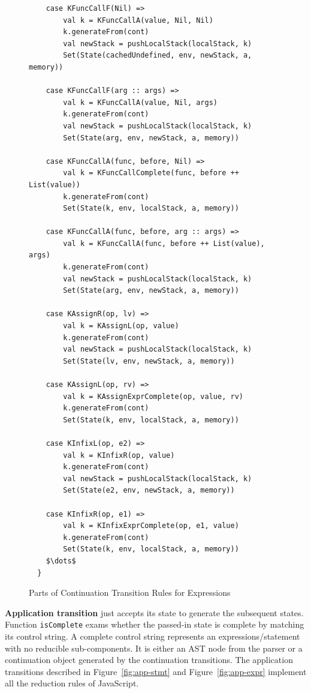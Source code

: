 \documentclass[12pt]{report}
\begin{document}
\begin{figure}
\lstset{language=Scala, mathescape,
basicstyle=\scriptsize\ttfamily}
\begin{lstlisting}
    case KFuncCallF(Nil) =>
        val k = KFuncCallA(value, Nil, Nil)
        k.generateFrom(cont)
        val newStack = pushLocalStack(localStack, k)
        Set(State(cachedUndefined, env, newStack, a, memory))

    case KFuncCallF(arg :: args) =>
        val k = KFuncCallA(value, Nil, args)
        k.generateFrom(cont)
        val newStack = pushLocalStack(localStack, k)
        Set(State(arg, env, newStack, a, memory))

    case KFuncCallA(func, before, Nil) =>
        val k = KFuncCallComplete(func, before ++ List(value))
        k.generateFrom(cont)
        Set(State(k, env, localStack, a, memory))

    case KFuncCallA(func, before, arg :: args) =>
        val k = KFuncCallA(func, before ++ List(value), args)
        k.generateFrom(cont)
        val newStack = pushLocalStack(localStack, k)
        Set(State(arg, env, newStack, a, memory))

    case KAssignR(op, lv) =>
        val k = KAssignL(op, value)
        k.generateFrom(cont)
        val newStack = pushLocalStack(localStack, k)
        Set(State(lv, env, newStack, a, memory))

    case KAssignL(op, rv) =>
        val k = KAssignExprComplete(op, value, rv)
        k.generateFrom(cont)
        Set(State(k, env, localStack, a, memory))

    case KInfixL(op, e2) =>
        val k = KInfixR(op, value)
        k.generateFrom(cont)
        val newStack = pushLocalStack(localStack, k)
        Set(State(e2, env, newStack, a, memory))

    case KInfixR(op, e1) =>
        val k = KInfixExprComplete(op, e1, value)
        k.generateFrom(cont)
        Set(State(k, env, localStack, a, memory))
    $\dots$
  }
\end{lstlisting}
\caption{Parts of Continuation Transition Rules for Expressions}
\label{fig:cont-expr}
\end{figure}

\textbf{Application transition} just accepts its state to generate the subsequent states. Function \verb|isComplete| exams whether the passed-in state is complete by matching its control string.
A complete control string represents an expressions/statement with no reducible sub-components.
It is either an AST node from the parser or a continuation object generated by the continuation transitions.
The application transitions described in Figure~\ref{fig:app-stmt} and Figure~\ref{fig:app-expr} implement all the reduction rules of JavaScript.
\end{document}
